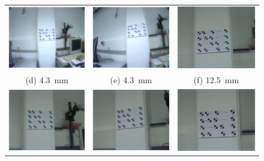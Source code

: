 \documentclass[
a4paper,     %
11pt         %
]{scrartcl}  %
\begin{document}
\begin{figure}[ht!]
\begin{tabular}{ccc}
 \includegraphics[width=48mm]{./Bildg_Messtechnik_Lab/CrossRatio/images/image_a4.png} & \includegraphics[width=48mm]{./Bildg_Messtechnik_Lab/CrossRatio/images/image_a5.png} & \includegraphics[width=48mm]{./Bildg_Messtechnik_Lab/CrossRatio/images/image_b1.png}\\
(d) \SI{4.3}{mm}& (e) \SI{4.3}{mm} & (f) \SI{12.5}{mm}\\[6pt]
 \includegraphics[width=48mm]{./Bildg_Messtechnik_Lab/CrossRatio/images/image_b2.png} & \includegraphics[width=48mm]{./Bildg_Messtechnik_Lab/CrossRatio/images/image_b3.png} & \includegraphics[width=48mm]{./Bildg_Messtechnik_Lab/CrossRatio/images/image_b4.png}\\

\end{tabular}
\end{figure}
\end{document}
